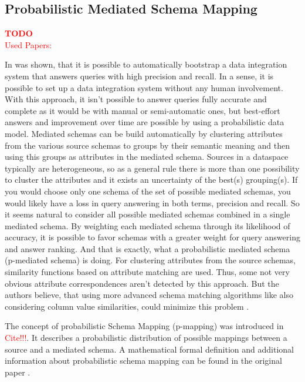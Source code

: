 \subsection{Probabilistic Mediated Schema Mapping}
\textcolor{red}{\textbf{TODO}}\\
\textcolor{red}{Used Papers: \cite{DasSarma:2008:BPD:1376616.1376702}}

In \cite{DasSarma:2008:BPD:1376616.1376702} was shown, that it is possible to automatically bootstrap a data integration system that answers queries with high precision and recall. In a sense, it is possible to set up a data integration system without any human involvement. With this approach, it isn't possible to answer queries fully accurate and complete as it would be with manual or semi-automatic ones, but best-effort answers and improvement over time are possible by using a probabilistic data model. 
Mediated schemas can be build automatically by clustering attributes from the various source schemas to groups by their semantic meaning and then using this groups as attributes in the mediated schema. Sources in a dataspace typically are heterogeneous, so as a general rule there is more than one possibility to cluster the attributes and it exists an uncertainty of the best(s) grouping(s). If you would choose only one schema of the set of possible mediated schemas, you would likely have a loss in query answering in both terms, precision and recall.  So it seems natural to consider all possible mediated schemas combined in a single mediated schema. By weighting each mediated schema through its likelihood of accuracy, it is possible to favor schemas with a greater weight for query answering and answer ranking. And that is exactly, what a probabilistic mediated schema (p-mediated schema) is doing.
For clustering attributes from the source schemas, similarity functions based on attribute matching are used. Thus, some not very obvious attribute correspondences aren't detected by this approach. But the authors believe, that using more advanced schema matching algorithms like also considering column value similarities, could minimize this problem \cite{DasSarma:2008:BPD:1376616.1376702}.

The concept of probabilistic Schema Mapping (p-mapping) was introduced in \textcolor{red}{Cite!!!}. It describes a probabilistic distribution of possible mappings between a source and a mediated schema. A mathematical formal definition and additional information about probabilistic schema mapping can be found in the original paper \cite{DasSarma:2008:BPD:1376616.1376702}.
 
